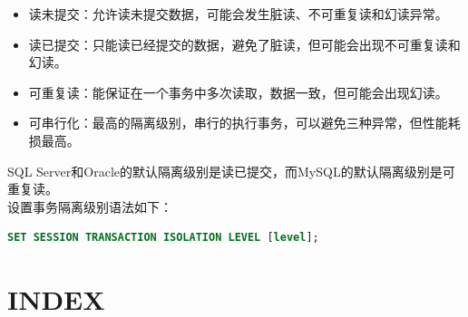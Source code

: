 \documentclass[12pt, openany, oneside]{book}
\begin{document}
\begin{table}[H]
    \centering
    \caption{隔离级别}
\end{table}

\begin{itemize}
    \item 读未提交：允许读未提交数据，可能会发生脏读、不可重复读和幻读异常。

    \item 读已提交：只能读已经提交的数据，避免了脏读，但可能会出现不可重复读和幻读。

    \item 可重复读：能保证在一个事务中多次读取，数据一致，但可能会出现幻读。

    \item 可串行化：最高的隔离级别，串行的执行事务，可以避免三种异常，但性能耗损最高。
\end{itemize}

SQL Server和Oracle的默认隔离级别是读已提交，而MySQL的默认隔离级别是可重复读。 \\

设置事务隔离级别语法如下：

\vspace{-0.5cm}

\begin{lstlisting}[language=SQL]
SET SESSION TRANSACTION ISOLATION LEVEL [level];
\end{lstlisting}

\newpage

\chapter{INDEX}
\end{document}

